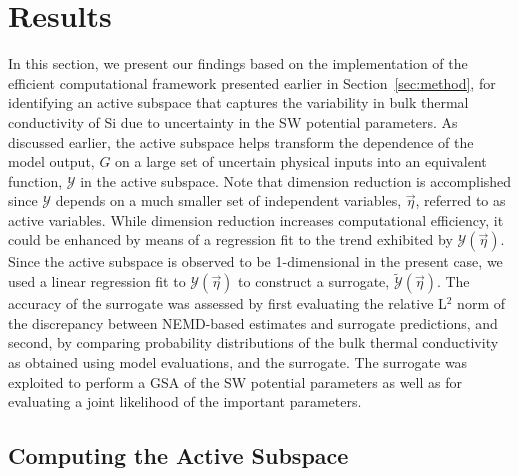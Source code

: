 \section{Results}
\label{sec:results}

In this section, we present our findings based on the implementation of the efficient computational framework 
presented earlier in Section~\ref{sec:method}, for identifying an active subspace that captures the variability
in bulk thermal conductivity of Si due to uncertainty in the SW potential parameters. As discussed earlier, the
active subspace helps transform the dependence of the model output, $G$ on a large set of uncertain physical
inputs into an equivalent function, $\mathcal{Y}$ in the active subspace. Note that dimension reduction is
accomplished since $\mathcal{Y}$ depends on a much smaller set of independent variables, $\vec\eta$,
referred to as active variables. While dimension reduction increases computational efficiency, it could be enhanced
by means of a regression fit to the trend exhibited by $\mathcal{Y}(\vec{\eta})$. Since the active subspace is
observed to be 1-dimensional in the present case, we used a linear regression fit to $\mathcal{Y}(\vec{\eta})$
to construct a surrogate, $\tilde{\mathcal{Y}}(\vec{\eta})$.
The accuracy of the surrogate was assessed by first evaluating the 
relative L$^2$ norm of the discrepancy between NEMD-based estimates and surrogate predictions,
and second, by comparing probability distributions of the bulk thermal conductivity as obtained using
model evaluations, and the surrogate. The surrogate was exploited to perform a GSA of the SW
potential parameters as well as for evaluating a joint likelihood of the important parameters.

\subsection{Computing the Active Subspace}
\label{sub:cas}

